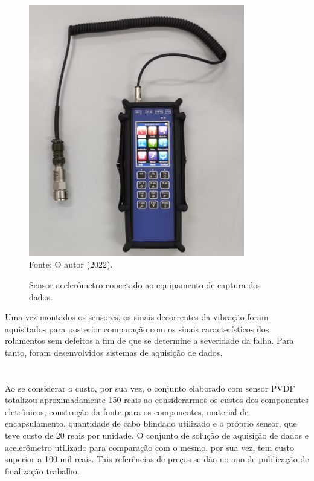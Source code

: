 \documentclass[
	12pt,				
	oneside,			
	a4paper,			
	english,			
	brazil,	
	sumario=abnt-6027-2012		
	]{abntex2ppgsi}
\begin{document}
\begin{figure}[H]
\centering
\caption {Sensor acelerômetro conectado ao equipamento de captura dos dados.}
\includegraphics[width=\textwidth,height=110mm,keepaspectratio]{adash} \\
Fonte: O autor (2022).
\label{adash}
\end{figure} 

Uma vez montados os sensores, os sinais decorrentes da vibração foram aquisitados para posterior comparação com os sinais característicos dos rolamentos sem defeitos a fim de que se determine a severidade da falha. Para tanto, foram desenvolvidos sistemas de aquisição de dados. 

\section{}

Ao se considerar o custo, por sua vez, o conjunto elaborado com sensor PVDF totalizou aproximadamente 150 reais ao considerarmos os custos dos componentes eletrônicos, construção da fonte para os componentes, material de encapsulamento, quantidade de cabo blindado utilizado e o próprio sensor, que teve custo de 20 reais por unidade. O conjunto de solução de aquisição de dados e acelerômetro utilizado para comparação com o mesmo, por sua vez, tem custo superior a 100 mil reais. Tais referências de preços se dão no ano de publicação de finalização trabalho.

\section{}
\end{document}
